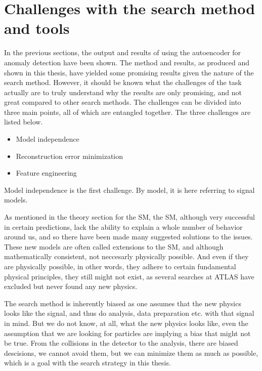 \section{Challenges with the search method and tools}

In the previous sections, the output and results of using the autoencoder for anomaly detection have been shown. 
The method and results, as produced and shown in this thesis, have yielded some promising results given the nature 
of the search method. However, it should be known what the challenges of the task actually are to truly understand 
why the results are only promising, and not great compared to other search methods. The challenges can be divided into 
three main points, all of which are entangled together. The three challenges are listed below. 

\begin{itemize}
    \item Model independence
    \item Reconstruction error minimization
    \item Feature engineering
\end{itemize}

Model independence is the first challenge. By model, it is here referring to signal models. 

As mentioned in the theory section for the SM, 
the SM, although very successful in certain predictions, lack the ability to explain a whole number of 
behavior around us, and so there have been made many suggested solutions to the issues. These new models are 
often called extensions to the SM, and although mathematically consistent, not neccesarly physically possible. 
And even if they are physically possible, in other words, they adhere to certain fundamental physical principles, they 
still might not exist, as several searches at ATLAS have excluded but never found any new physics. 

The search method is inherently 
biased as one assumes that the new physics looks like the signal, and thus do analysis, data preparation etc. with that 
signal in mind. But we do not know, at all, what the new physics looks like, even the assumption that we are looking for 
particles are implying a bias that might not be true. From the collisions in the detector to the analysis, there are biased descisions, 
we cannot avoid them, but we can minimize them as much as possible, which is a goal with the search strategy in this thesis. \par

